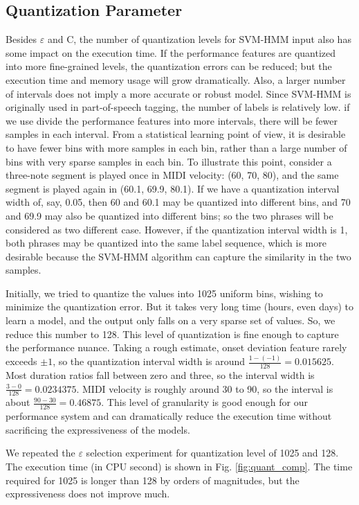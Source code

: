 \subsection{Quantization Parameter}
Besides $\varepsilon$ and C, the number of quantization levels for SVM-HMM input also has some impact on the execution time. If the performance features are quantized into more fine-grained levels, the quantization errors can be reduced; but the execution time and memory usage will grow dramatically. Also, a larger number of intervals does not imply a more accurate or robust model. Since SVM-HMM is originally used in part-of-speech tagging, the number of labels is relatively low. if we use divide the performance features into more intervals, there will be fewer samples in each interval. From a statistical learning point of view, it is desirable to have fewer bins with more samples in each bin, rather than a large number of bins with very sparse samples in each bin. To illustrate this point, consider a three-note segment is played once in MIDI velocity: (60, 70, 80), and the same segment is played again in (60.1, 69.9, 80.1). If we have a quantization interval width of, say, 0.05, then 60 and 60.1 may be quantized into different bins, and 70 and 69.9 may also be quantized into different bins; so the two phrases will be considered as two different case. However, if the quantization interval width is 1, both phrases may be quantized into the same label sequence, which is more desirable because the SVM-HMM algorithm can capture the similarity in the two samples. 

Initially, we tried to quantize the values into 1025 uniform bins, wishing to minimize the quantization error. But it takes very long time (hours, even days) to learn a model, and the output only falls on a very sparse set of values. So, we reduce this number to 128. This level of quantization is fine enough to capture the performance nuance. Taking a rough estimate, onset deviation feature rarely exceeds $\pm 1$, so the quantization interval width is around $\frac{1-(-1)}{128} = 0.015625$. Most duration ratios fall between zero and three, so the interval width is $\frac{3-0}{128} = 0.0234375$. MIDI velocity is roughly around 30 to 90, so the interval is about $\frac{90-30}{128} = 0.46875$. This level of granularity is good enough for our performance system and can dramatically reduce the execution time without sacrificing the expressiveness of the models. 

We repeated the $\varepsilon$ selection experiment for quantization level of 1025 and 128. The execution time (in CPU second) is shown in Fig. \ref{fig:quant_comp}. The time required for 1025 is longer than 128 by orders of magnitudes, but the expressiveness does not improve much.%

